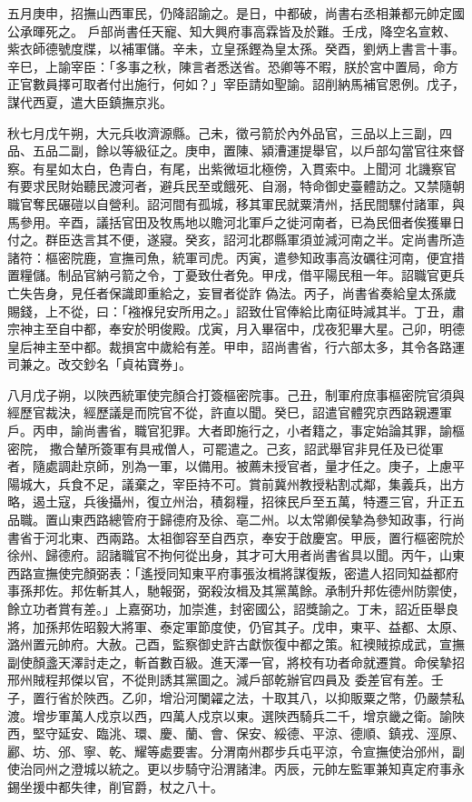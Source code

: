 \begin{pinyinscope}
 五月庚申，招撫山西軍民，仍降詔諭之。是日，中都破，尚書右丞相兼都元帥定國公承暉死之。
 戶部尚書任天寵、知大興府事高霖皆及於難。壬戌，降空名宣敕、紫衣師德號度牒，以補軍儲。辛未，立皇孫鏗為皇太孫。癸酉，劉炳上書言十事。辛巳，上諭宰臣：「多事之秋，陳言者悉送省。恐卿等不暇，朕於宮中置局，命方正官數員擇可取者付出施行，何如？」宰臣請如聖諭。詔削納馬補官恩例。戊子，謀代西夏，遣大臣鎮撫京兆。



 秋七月戊午朔，大元兵收濟源縣。己未，徵弓箭於內外品官，三品以上三副，四品、五品二副，餘以等級征之。庚申，置陳、潁漕運提舉官，以戶部勾當官往來督察。有星如太白，色青白，有尾，出紫微垣北極傍，入貫索中。上聞河
 北譏察官有要求民財始聽民渡河者，避兵民至或餓死、自溺，特命御史臺體訪之。又禁隨朝職官奪民碾磑以自營利。詔河間有孤城，移其軍民就粟清州，括民間騾付諸軍，與馬參用。辛酉，議括官田及牧馬地以贍河北軍戶之徙河南者，已為民佃者俟獲畢日付之。群臣迭言其不便，遂寢。癸亥，詔河北郡縣軍須並減河南之半。定尚書所造諸符：樞密院鹿，宣撫司魚，統軍司虎。丙寅，遣參知政事高汝礪往河南，便宜措置糧儲。制品官納弓箭之令，丁憂致仕者免。甲戌，借平陽民租一年。詔職官更兵亡失告身，見任者保識即重給之，妄冒者從詐
 偽法。丙子，尚書省奏給皇太孫歲賜錢，上不從，曰：「襁褓兒安所用之。」詔致仕官俸給比南征時減其半。丁丑，肅宗神主至自中都，奉安於明俊殿。戊寅，月入畢宿中，戊夜犯畢大星。己卯，明德皇后神主至中都。裁損宮中歲給有差。甲申，詔尚書省，行六部太多，其令各路運司兼之。改交鈔名「貞祐寶券」。



 八月戊子朔，以陜西統軍使完顏合打簽樞密院事。己丑，制軍府庶事樞密院官須與經歷官裁決，經歷議是而院官不從，許直以聞。癸巳，詔遣官體究京西路親遷軍戶。丙申，諭尚書省，職官犯罪。大者即施行之，小者籍之，事定始論其罪，諭樞密院，
 撒合輦所簽軍有具戒僧人，可罷遣之。己亥，詔武舉官非見任及已從軍者，隨處調赴京師，別為一軍，以備用。被薦未授官者，量才任之。庚子，上慮平陽城大，兵食不足，議棄之，宰臣持不可。賞前冀州教授粘割忒鄰，集義兵，出方略，遏土寇，兵後攝州，復立州治，積芻糧，招徠民戶至五萬，特遷三官，升正五品職。置山東西路總管府于歸德府及徐、亳二州。以太常卿侯摯為參知政事，行尚書省于河北東、西兩路。太祖御容至自西京，奉安于啟慶宮。甲辰，置行樞密院於徐州、歸德府。詔諸職官不拘何從出身，其才可大用者尚書省具以聞。丙午，山東
 西路宣撫使完顏弼表：「遙授同知東平府事張汝楫將謀復叛，密遣人招同知益都府事孫邦佐。邦佐斬其人，馳報弼，弼殺汝楫及其黨萬餘。承制升邦佐德州防禦使，餘立功者賞有差。」上嘉弼功，加崇進，封密國公，詔獎諭之。丁未，詔近臣舉良將，加孫邦佐昭毅大將軍、泰定軍節度使，仍官其子。戊申，東平、益都、太原、潞州置元帥府。大赦。己酉，監察御史許古獻恢復中都之策。紅襖賊掠成武，宣撫副使顏盞天澤討走之，斬首數百級。進天澤一官，將校有功者命就遷賞。命侯摯招邢州賊程邦傑以官，不從則誘其黨圖之。減戶部乾辦官四員及
 委差官有差。壬子，置行省於陜西。乙卯，增沿河闌糴之法，十取其八，以抑販粟之幣，仍嚴禁私渡。增步軍萬人戍京以西，四萬人戍京以東。選陜西騎兵二千，增京畿之衛。諭陜西，堅守延安、臨洮、環、慶、蘭、會、保安、綏德、平涼、德順、鎮戎、涇原、酈、坊、邠、寧、乾、耀等處要害。分渭南州郡步兵屯平涼，令宣撫使治邠州，副使治同州之澄城以統之。更以步騎守沿渭諸津。丙辰，元帥左監軍兼知真定府事永錫坐援中都失律，削官爵，杖之八十。




\end{pinyinscope}
